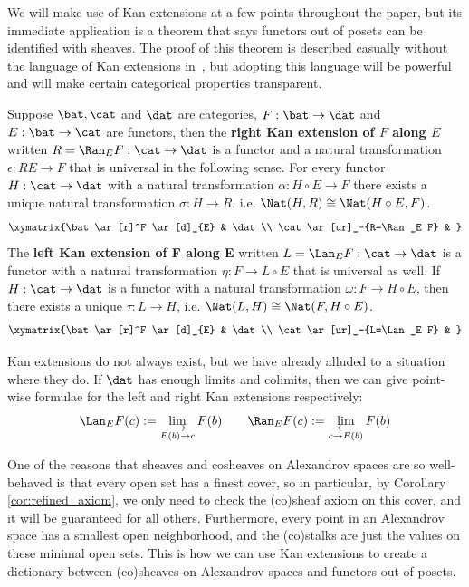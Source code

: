\begin{rmk}[Caveat]
	We will make use of Kan extensions at a few points throughout the paper, but its immediate application is a theorem that says functors out of posets can be identified with sheaves. The proof of this theorem is described casually without the language of Kan extensions in~\cite{sl-dereq}, but adopting this language will be powerful and will make certain categorical properties transparent. 
\end{rmk}

\begin{defn}
	Suppose $\bat,\cat$ and $\dat$ are categories, $F:\bat\to\dat$ and $E:\bat\to\cat$ are functors, then the \textbf{right Kan extension of $F$ along $E$} written $R=\Ran_E F:\cat\to\dat$ is a functor and a natural transformation $\epsilon:RE\to F$ that is universal in the following sense. For every functor $H:\cat\to \dat$ with a natural transformation $\alpha:H\circ E\to F$ there exists a unique natural transformation $\sigma: H\to R$, i.e. $\Nat(H,R)\cong\Nat(H\circ E, F)$.
	\[
		\xymatrix{\bat \ar[r]^F \ar[d]_{E} & \dat \\
		\cat \ar[ur]_-{R=\Ran_E F} & }
	\]
	The \textbf{left Kan extension of F along E} written $L=\Lan_E F:\cat\to\dat$ is a functor with a natural transformation $\eta:F\to L\circ E$ that is universal as well. If $H:\cat\to\dat$ is a functor with a natural transformation $\omega: F\to H\circ E$, then there exists a unique $\tau:L\to H$, i.e. $\Nat(L,H)\cong \Nat(F,H\circ E)$.
	\[
		\xymatrix{\bat \ar[r]^F \ar[d]_{E} & \dat \\
		\cat \ar[ur]_-{L=\Lan_E F} & }
	\]
\end{defn}

\begin{rmk}
	Kan extensions do not always exist, but we have already alluded to a situation where they do. If $\dat$ has enough limits and colimits, then we can give point-wise formulae for the left and right Kan extensions respectively:
	\[
		\Lan_E F (c):=\varinjlim_{E(b)\to c} F(b) \qquad \Ran_E F (c):=\varprojlim_{c\to E(b)} F(b)
	\]
\end{rmk}

One of the reasons that sheaves and cosheaves on Alexandrov spaces are so well-behaved is that every open set has a finest cover, so in particular, by Corollary \ref{cor:refined_axiom}, we only need to check the (co)sheaf axiom on this cover, and it will be guaranteed for all others. Furthermore, every point in an Alexandrov space has a smallest open neighborhood, and the (co)stalks are just the values on these minimal open sets. This is how we can use Kan extensions to create a dictionary between (co)sheaves on Alexandrov spaces and functors out of posets. 

